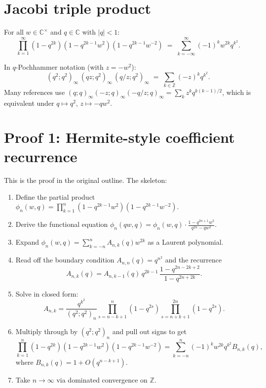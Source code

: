 \section{Jacobi triple product}

\begin{theorem}\label{thm:jtp}
For all $w \in \mathbb{C}^\times$ and $q \in \mathbb{C}$ with $|q| < 1$:
\[
\prod_{k=1}^{\infty} (1 - q^{2k})(1 - q^{2k-1} w^2)(1 - q^{2k-1} w^{-2})
\;=\; \sum_{k=-\infty}^{\infty} (-1)^k w^{2k} q^{k^2}.
\]
\end{theorem}

In $q$-Pochhammer notation (with $z = -w^2$):
\[
(q^2; q^2)_\infty \, (q z; q^2)_\infty \, (q/z; q^2)_\infty
\;=\; \sum_{k \in \mathbb{Z}} (-z)^k q^{k^2}.
\]
Many references use $(q;q)_\infty (-z;q)_\infty (-q/z;q)_\infty = \sum_k z^k q^{k(k-1)/2}$, which is equivalent under $q \mapsto q^2$, $z \mapsto -qw^2$.

\section{Proof 1: Hermite-style coefficient recurrence}
\label{sec:hermite}

This is the proof in the original outline. The skeleton:

\begin{enumerate}\item Define the partial product $\phi_n(w, q) = \prod_{k=1}^n (1 - q^{2k-1} w^2)(1 - q^{2k-1} w^{-2})$.
\item Derive the functional equation $\phi_n(qw, q) = \phi_n(w, q) \cdot \frac{1 - q^{2n+1} w^2}{q^{2n} - q w^2}$.
\item Expand $\phi_n(w, q) = \sum_{k=-n}^n A_{n,k}(q) w^{2k}$ as a Laurent polynomial.
\item Read off the boundary condition $A_{n,n}(q) = q^{n^2}$ and the recurrence
\[
A_{n,k}(q) = A_{n, k-1}(q) \, q^{2k-1} \, \frac{1 - q^{2n - 2k + 2}}{1 - q^{2n + 2k}}.
\]
\item Solve in closed form:
\[
A_{n,k} = \frac{q^{k^2}}{(q^2; q^2)_n} \prod_{s = n - k + 1}^n (1 - q^{2s}) \prod_{s = n + k + 1}^{2n} (1 - q^{2s}).
\]
\item Multiply through by $(q^2; q^2)_n$ and pull out signs to get
\[
\prod_{k=1}^n (1 - q^{2k})(1 - q^{2k-1} w^2)(1 - q^{2k-1} w^{-2})
= \sum_{k=-n}^n (-1)^k w^{2k} q^{k^2} B_{n,k}(q),
\]
where $B_{n,k}(q) = 1 + O(q^{n-k+1})$.
\item Take $n \to \infty$ via dominated convergence on $\mathbb{Z}$.
\end{enumerate}

